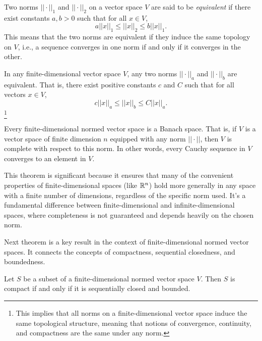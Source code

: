 \begin{definition}
    Two norms \( || \cdot ||_1 \) and \( || \cdot ||_2 \) on a vector space \( V \) are said to be \textit{equivalent} if there exist constants \( a, b > 0 \) such that for all \( x \in V \),
    \[
    a ||x||_1 \leq ||x||_2 \leq b ||x||_1.
    \]
    This means that the two norms are equivalent if they induce the same topology on \( V \), i.e., a sequence converges in one norm if and only if it converges in the other.
\end{definition}

\begin{theorem}
    In any finite-dimensional vector space \( V \), any two norms \( ||\cdot||_a \) and \( ||\cdot||_b \) are equivalent. That is, there exist positive constants \( c \) and \( C \) such that for all vectors \( x \in V \),
    \[
    c ||x||_a \leq ||x||_b \leq C ||x||_a.
    \]\footnote{
    This implies that all norms on a finite-dimensional vector space induce the same topological structure, meaning that notions of convergence, continuity, and compactness are the same under any norm.}
\end{theorem}

\begin{theorem}
    Every finite-dimensional normed vector space is a Banach space. That is, if \( V \) is a vector space of finite dimension \( n \) equipped with any norm \( ||\cdot|| \), then \( V \) is complete with respect to this norm. In other words, every Cauchy sequence in \( V \) converges to an element in \( V \).
\end{theorem}
This theorem is significant because it ensures that many of the convenient properties of finite-dimensional spaces (like
$\mathbb R^n$) hold more generally in any space with a finite number of dimensions, regardless of the specific norm used. It's a fundamental difference between finite-dimensional and infinite-dimensional spaces, where completeness is not guaranteed and depends heavily on the chosen norm.


Next theorem is a key result in the context of finite-dimensional normed vector spaces. It connects the concepts of compactness, sequential closedness, and boundedness.
\begin{theorem}
    Let \( S \) be a subset of a finite-dimensional normed vector space \( V \). Then \( S \) is compact if and only if it is sequentially closed and bounded.
\end{theorem}

